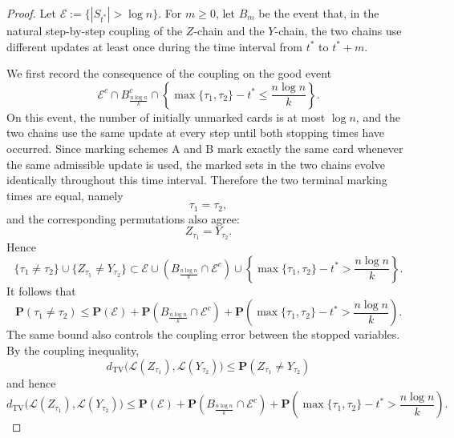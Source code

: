 \begin{proof}
    Let $\mathcal E:=\{|S_{t^*}|>\log n\}$.
    For $m\geq 0$, let $B_m$ be the event that, in the natural step-by-step coupling of the $Z$-chain and the $Y$-chain, the two chains use different updates at least once during the time interval from $t^*$ to $t^*+m$.

    We first record the consequence of the coupling on the good event
    $$
    \mathcal E^c\cap B^c_{\frac{n\log n}{k}}\cap
    \left\{
    \max\{\tau_1,\tau_2\}-t^*\leq \frac{n\log n}{k}
    \right\}.
    $$
    On this event, the number of initially unmarked cards is at most $\log n$,
    and the two chains use the same update at every step until both stopping
    times have occurred. Since marking schemes A and B mark exactly the same
    card whenever the same admissible update is used, the marked sets in the
    two chains evolve identically throughout this time interval. Therefore the
    two terminal marking times are equal, namely
    $$
    \tau_1=\tau_2,
    $$
    and the corresponding permutations also agree:
    $$
    Z_{\tau_1}=Y_{\tau_2}.
    $$
    Hence
    $$
    \{\tau_1\neq \tau_2\}\cup\{Z_{\tau_1}\neq Y_{\tau_2}\}
    \subset
    \mathcal E\cup
    \left(B_{\frac{n\log n}{k}}\cap \mathcal E^c\right)
    \cup
    \left\{
    \max\{\tau_1,\tau_2\}-t^*>\frac{n\log n}{k}
    \right\}.
    $$
    It follows that
    $$
    \mathbf P(\tau_1\neq \tau_2)
    \leq
    \mathbf P(\mathcal E)
    +
    \mathbf P\left(B_{\frac{n\log n}{k}}\cap \mathcal E^c\right)
    +
    \mathbf P\left(
    \max\{\tau_1,\tau_2\}-t^*>\frac{n\log n}{k}
    \right).
    $$
    The same bound also controls the coupling error between the stopped
    variables. By the coupling inequality,
    $$
    d_{\mathrm{TV}}\bigl(\mathcal L(Z_{\tau_1}),\mathcal L(Y_{\tau_2})\bigr)
    \leq
    \mathbf P(Z_{\tau_1}\neq Y_{\tau_2})
    $$
    and hence
    $$
    d_{\mathrm{TV}}\bigl(\mathcal L(Z_{\tau_1}),\mathcal L(Y_{\tau_2})\bigr)
    \leq
    \mathbf P(\mathcal E)
    +
    \mathbf P\left(B_{\frac{n\log n}{k}}\cap \mathcal E^c\right)
    +
    \mathbf P\left(
    \max\{\tau_1,\tau_2\}-t^*>\frac{n\log n}{k}
    \right).
    $$


\end{proof}
